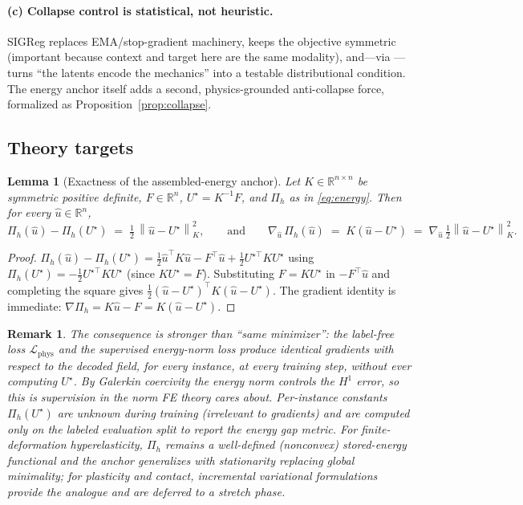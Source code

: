 \documentclass[11pt]{article}
\newtheorem{lemma}{Lemma}
\newtheorem{remark}{Remark}
\newcommand{\R}{\mathbb{R}}
\newcommand{\norm}[1]{\left\lVert #1 \right\rVert}
\begin{document}
\paragraph{(c) Collapse control is statistical, not heuristic.}
SIGReg \cite{balestriero2025lejepa} replaces EMA/stop-gradient machinery,
keeps the objective symmetric (important because context and target here are
the same modality), and---via \cite{klindt2026}---turns ``the latents encode
the mechanics'' into a testable distributional condition. The energy anchor
itself adds a second, physics-grounded anti-collapse force, formalized as
Proposition~\ref{prop:collapse}.

\subsection{Theory targets}
\label{sec:theory}

\begin{lemma}[Exactness of the assembled-energy anchor]
\label{lem:energy}
Let $K\in\R^{n\times n}$ be symmetric positive definite, $F\in\R^n$,
$U^\star=K^{-1}F$, and $\Pi_h$ as in \eqref{eq:energy}. Then for every
$\hat u\in\R^n$,
\[
\Pi_h(\hat u)-\Pi_h(U^\star)\;=\;\tfrac12\,\norm{\hat u-U^\star}_K^2,
\qquad\text{and}\qquad
\nabla_{\hat u}\,\Pi_h(\hat u)\;=\;K(\hat u-U^\star)
\;=\;\nabla_{\hat u}\,\tfrac12\norm{\hat u-U^\star}_K^2 .
\]
\end{lemma}

\begin{proof}
$\Pi_h(\hat u)-\Pi_h(U^\star)
=\tfrac12\hat u^\top K\hat u-F^\top\hat u
+\tfrac12 U^{\star\top}KU^\star$ using
$\Pi_h(U^\star)=-\tfrac12 U^{\star\top}KU^\star$ (since $KU^\star=F$).
Substituting $F=KU^\star$ in $-F^\top\hat u$ and completing the square gives
$\tfrac12(\hat u-U^\star)^\top K(\hat u-U^\star)$. The gradient identity is
immediate: $\nabla\Pi_h=K\hat u-F=K(\hat u-U^\star)$.
\end{proof}

\begin{remark}
The consequence is stronger than ``same minimizer'': the \emph{label-free}
loss $\mathcal{L}_{\mathrm{phys}}$ and the \emph{supervised} energy-norm loss
produce identical gradients with respect to the decoded field, for every
instance, at every training step, without ever computing $U^\star$. By
Galerkin coercivity the energy norm controls the $H^1$ error, so this is
supervision in the norm FE theory cares about. Per-instance constants
$\Pi_h(U^\star)$ are unknown during training (irrelevant to gradients) and
are computed only on the labeled evaluation split to report the
\emph{energy gap} metric. For finite-deformation hyperelasticity, $\Pi_h$
remains a well-defined (nonconvex) stored-energy functional and the anchor
generalizes with stationarity replacing global minimality; for plasticity and
contact, incremental variational formulations provide the analogue and are
deferred to a stretch phase.
\end{remark}
\end{document}
